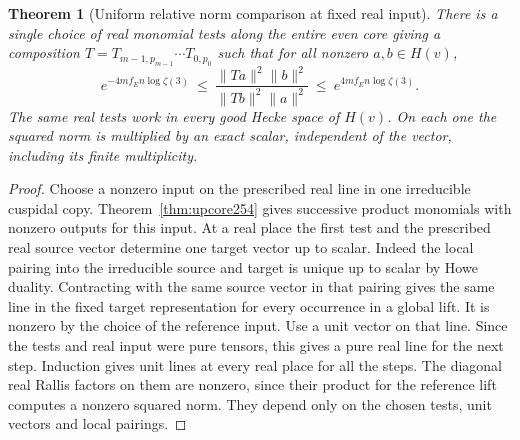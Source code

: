 \documentclass[a4paper,11pt]{article}
\newtheorem{theorem}[proposition]{Theorem}
\theoremstyle{definition}
\theoremstyle{remark}
\numberwithin{equation}{section}
\begin{document}
\begin{theorem}[Uniform relative norm comparison at fixed real input]\leavevmode
\label{thm:corenorms255}
There is a single choice of real monomial tests along the entire
even core giving a composition \(T=T_{m-1,p_{m-1}}\cdots T_{0,p_0}\)
such that for all nonzero \(a,b\in H(v)\),
\[
  e^{-4m f_E n\log\zeta(3)}
   \ \le\ \frac{\|Ta\|^2\|b\|^2}{\|Tb\|^2\|a\|^2}
   \ \le\ e^{4m f_E n\log\zeta(3)} .
\]
The same real tests work in every good Hecke space of \(H(v)\).
On each one the squared norm is multiplied by an exact scalar,
independent of the vector, including its finite multiplicity.
\end{theorem}
\begin{proof}
Choose a nonzero input on the prescribed real line in one
irreducible cuspidal copy. Theorem~\ref{thm:upcore254} gives
successive product monomials with nonzero outputs for this
input. At a real place the first test and the prescribed real
source vector determine one target vector up to scalar.
Indeed the local pairing into the irreducible source and target
is unique up to scalar by Howe duality. Contracting with the
same source vector in that pairing gives the same line in the
fixed target representation for every occurrence in a global
lift. It is nonzero by the choice of the reference input.
Use a unit vector on that line. Since the tests and real input
were pure tensors, this gives a pure real line for the next
step. Induction gives unit lines at every real place for all
the steps. The diagonal real Rallis factors on them are
nonzero, since their product for the reference lift computes
a nonzero squared norm. They depend only on the chosen tests,
unit vectors and local pairings.


\end{proof}
\end{document}
